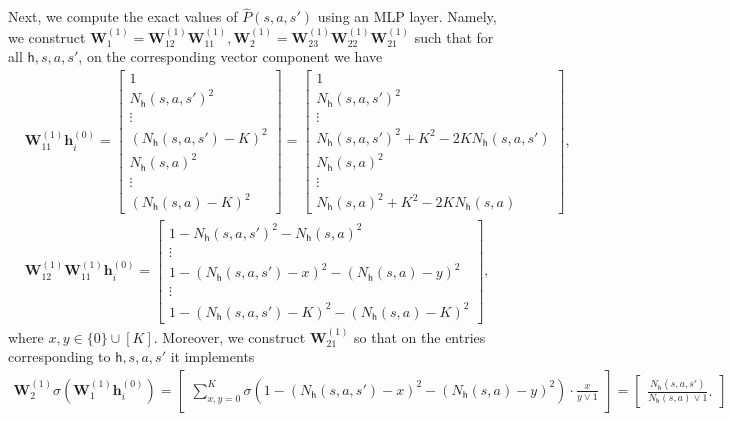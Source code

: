 \documentclass[10pt]{article}
\newcommand{\<}{\left\langle}
\renewcommand{\>}{\right\rangle}
\newcommand{\state}{{s}}
\newcommand{\action}{{a}}
\newcommand{\Numepi}{{K}}
\newcommand{\esttransit}{\widehat{P}}
\newcommand{\Numvi}{{N}}
\def\bW{{\mathbf W}}
\def\bh{{\mathbf h}}
\def\sh{{\mathsf{h}}}
\begin{document}
Next, we compute the exact values of $\esttransit(\state,\action,\state')$ using an MLP layer. Namely,
we  construct $\bW^{(1)}_1=\bW^{(1)}_{12}\bW^{(1)}_{11},\bW^{(1)}_2=\bW^{(1)}_{23}\bW^{(1)}_{22}\bW^{(1)}_{21}$  such that for all $\sh,\state,\action,\state'$, on the corresponding vector component we have
\begin{align*}
   & \bW^{(1)}_{11}\bh_i^{(0)}=     \begin{bmatrix}
    1\\
       \Numvi_\sh(\state,\action,\state')^2 \\\vdots
       \\
        (\Numvi_\sh(\state,\action,\state')-\Numepi)^2\\
         \Numvi_\sh(\state,\action)^2 \\\vdots
       \\
        (\Numvi_\sh(\state,\action)-\Numepi)^2
    \end{bmatrix}= \begin{bmatrix}
    1\\
       \Numvi_\sh(\state,\action,\state')^2 \\\vdots
       \\
        \Numvi_\sh(\state,\action,\state')^2+\Numepi^2-2\Numepi\Numvi_\sh(\state,\action,\state')\\
          \Numvi_\sh(\state,\action)^2 \\\vdots
       \\
        \Numvi_\sh(\state,\action)^2+\Numepi^2-2\Numepi\Numvi_\sh(\state,\action)
    \end{bmatrix},
    \\
&\bW^{(1)}_{12}\bW^{(1)}_{11}\bh_i^{(0)}=     \begin{bmatrix}
    1-
       \Numvi_\sh(\state,\action,\state')^2 - \Numvi_\sh(\state,\action)^2 \\\vdots
       \\ 1-
       (\Numvi_\sh(\state,\action,\state')-x)^2 - (\Numvi_\sh(\state,\action)-y)^2 \\\vdots\\
       1- (\Numvi_\sh(\state,\action,\state')-\Numepi)^2-(\Numvi_\sh(\state,\action)-\Numepi)^2
    \end{bmatrix} ,
\end{align*} where $x,y\in\{0\}\cup[\Numepi]$. Moreover,  we construct $\bW^{(1)}_{21}$ so that on the entries corresponding to $\sh,\state,\action,\state'$ it implements
\begin{align*}
\bW_{2}^{(1)}\sigma(\bW_{1}^{(1)}\bh_i^{(0)})
    =\begin{bmatrix}
        \sum_{x,y=0}^{\Numepi}\sigma(1- (\Numvi_\sh(\state,\action,\state')-x)^2 - (\Numvi_\sh(\state,\action)-y)^2)\cdot\frac{x}{y\vee1}
    \end{bmatrix}=\begin{bmatrix}
        \frac{\Numvi_\sh(\state,\action,\state')}{\Numvi_\sh(\state,\action)\vee1}.
    \end{bmatrix}
\end{align*}
\end{document}
